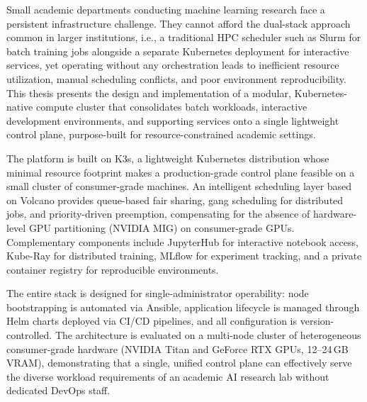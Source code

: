 Small academic departments conducting machine learning research face a persistent infrastructure challenge. They cannot afford the dual-stack approach common in larger institutions, i.e., a traditional HPC scheduler such as Slurm for batch training jobs alongside a separate Kubernetes deployment for interactive services, yet operating without any orchestration leads to inefficient resource utilization, manual scheduling conflicts, and poor environment reproducibility. This thesis presents the design and implementation of a modular, Kubernetes-native compute cluster that consolidates batch workloads, interactive development environments, and supporting services onto a single lightweight control plane, purpose-built for resource-constrained academic settings.

The platform is built on K3s, a lightweight Kubernetes distribution whose minimal resource footprint makes a production-grade control plane feasible on a small cluster of consumer-grade machines. An intelligent scheduling layer based on Volcano provides queue-based fair sharing, gang scheduling for distributed jobs, and priority-driven preemption, compensating for the absence of hardware-level GPU partitioning (NVIDIA MIG) on consumer-grade GPUs. Complementary components include JupyterHub for interactive notebook access, Kube-Ray for distributed training, MLflow for experiment tracking, and a private container registry for reproducible environments.

The entire stack is designed for single-administrator operability: node bootstrapping is automated via Ansible, application lifecycle is managed through Helm charts deployed via CI/CD pipelines, and all configuration is version-controlled. The architecture is evaluated on a multi-node cluster of heterogeneous consumer-grade hardware (NVIDIA Titan and GeForce RTX GPUs, 12--24\,GB VRAM), demonstrating that a single, unified control plane can effectively serve the diverse workload requirements of an academic AI research lab without dedicated DevOps staff.
